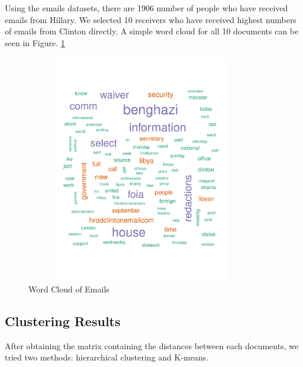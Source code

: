 Using the emails datasets, there are 1906 number of people who have received emails from Hillary. We selected 10 receivers who have received highest numbers of emails from Clinton directly.
A simple word cloud for all 10 documents can be seen in Figure. \ref{fig:wcloud}
\begin{figure}[h!]
    \centering
    \includegraphics[width=10cm,height=10cm]
    {daitong_and_yihe/wcloud}
    \caption{Word Cloud of Emails}
    \label{fig:wcloud}
\end{figure}

\newpage
\subsection{Clustering Results}
After obtaining the matrix containing the distances between each documents, we tried two methods: hierarchical clustering and K-means. 

